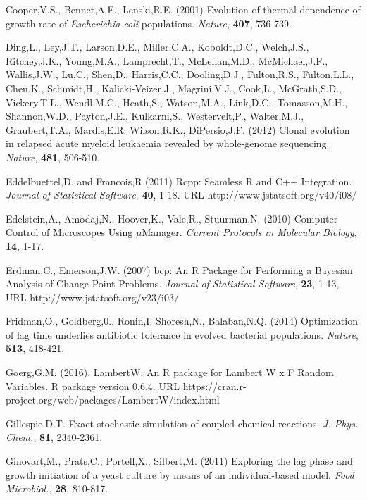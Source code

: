 \documentclass{bioinfo}
\begin{document}
{\begin{thebibliography}{}
Cooper,V.S., Bennet,A.F., Lenski,R.E. (2001) Evolution of thermal dependence of growth rate of \textit{Escherichia coli} populations. \textit{Nature}, \textbf{407}, 736-739.

Ding,L., Ley,J.T., Larson,D.E.,	Miller,C.A., Koboldt,D.C.,	Welch,J.S.,	Ritchey,J.K., Young,M.A., Lamprecht,T.,	McLellan,M.D., McMichael,J.F.,	Wallis,J.W., Lu,C.,	Shen,D.,	Harris,C.C.,	Dooling,D.J., Fulton,R.S.,	Fulton,L.L., Chen,K., Schmidt,H.,	Kalicki-Veizer,J., Magrini,V.J.,	Cook,L.,	McGrath,S.D.,	Vickery,T.L.,	Wendl,M.C.,	Heath,S., Watson,M.A.,	Link,D.C.,	Tomasson,M.H.,	Shannon,W.D., Payton,J.E.,	Kulkarni,S.,	Westervelt,P.,	Walter,M.J.,	Graubert,T.A., Mardis,E.R.	Wilson,R.K., DiPersio,J.F. (2012) Clonal evolution in relapsed acute myeloid leukaemia revealed by whole-genome sequencing. \textit{Nature}, \textbf{481}, 506-510.

Eddelbuettel,D. and Francois,R (2011) Rcpp: Seamless R and C++ Integration. \textit{Journal of Statistical Software}, \textbf{40}, 1-18. URL http://www.jstatsoft.org/v40/i08/

Edelstein,A., Amodaj,N., Hoover,K., Vale,R., Stuurman,N. (2010) Computer Control of Microscopes Using $\mu$Manager. \textit{Current Protocols in Molecular Biology}, \textbf{14}, 1-17.

Erdman,C., Emerson,J.W. (2007) bcp: An R Package for Performing a Bayesian Analysis of Change Point Problems. \textit{Journal of Statistical Software}, \textbf{23}, 1-13, URL http://www.jstatsoft.org/v23/i03/

Fridman,O., Goldberg,0., Ronin,I.	Shoresh,N.,	Balaban,N.Q. (2014) Optimization of lag time underlies antibiotic tolerance in evolved bacterial populations. \textit{Nature}, \textbf{513}, 418-421. 

Goerg,G.M. (2016). LambertW: An R package for Lambert W x F Random Variables. R package version 0.6.4. URL https://cran.r-project.org/web/packages/LambertW/index.html

Gillespie,D.T. Exact stochastic simulation of coupled chemical reactions. {\it J. Phys. Chem.}, {\bf 81}, 2340-2361. 

Ginovart,M., Prats,C., Portell,X., Silbert,M. (2011) Exploring the lag phase and growth initiation of a yeast culture by means of an individual-based model. {\it Food Microbiol.}, {\bf 28}, 810-817. 


\end{thebibliography}}
\end{document}
